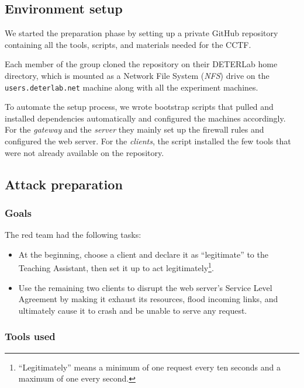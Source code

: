 \subsection{Environment setup}
\label{sec:cctf-resilient:env-setup}

We started the preparation phase by setting up a private GitHub repository containing all the tools, scripts, and materials needed for the CCTF. 

Each member of the group cloned the repository on their DETERLab home directory, which is mounted as a Network File System (\textit{NFS}) drive on the \texttt{users.deterlab.net} machine along with all the experiment machines.

To automate the setup process, we wrote bootstrap scripts that pulled and installed dependencies automatically and configured the machines accordingly. For the \textit{gateway} and the \textit{server} they mainly set up the firewall rules and configured the web server. For the \textit{clients}, the script installed the few tools that were not already available on the repository.


\subsection{Attack preparation}
\label{sec:cctf-resilient:att-prep}

\subsubsection{Goals}
\label{sec:cctf-resilient:att-prep:goals}

The red team had the following tasks:

\begin{itemize}
    \item At the beginning, choose a client and declare it as ``legitimate'' to the Teaching Assistant, then set it up to act legitimately\footnote{``Legitimately'' means a minimum of one request every ten seconds and a maximum of one every second.}.
    \item Use the remaining two clients to disrupt the web server's Service Level Agreement by making it exhaust its resources, flood incoming links, and ultimately cause it to crash and be unable to serve any request.
\end{itemize}

\subsubsection{Tools used}
\label{sec:cctf-resilient:att-prep:tools-used}

